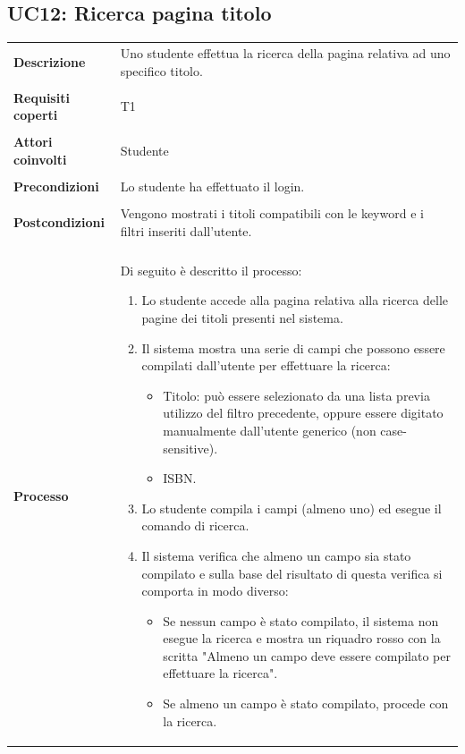 \documentclass[10pt,a4paper]{article}
\begin{document}
	\subsection{UC12: Ricerca pagina titolo}
	\begin{tabular}{lp{}}
		\textbf{Descrizione}&Uno studente effettua la ricerca della pagina relativa ad uno specifico titolo.\\
		\\
		\textbf{Requisiti coperti}&T1\\
		\\
		\textbf{Attori coinvolti}&Studente\\
		\\
		\textbf{Precondizioni}&Lo studente ha effettuato il login.\\
		\\
		\textbf{Postcondizioni}&Vengono mostrati i titoli compatibili con le keyword e i filtri inseriti dall'utente.\\
		\\
		\textbf{Processo}&Di seguito è descritto il processo:
		\begin{enumerate}
			\item Lo studente accede alla pagina relativa alla ricerca delle pagine dei titoli presenti nel sistema.
			\item Il sistema mostra una serie di campi che possono essere compilati dall'utente per effettuare la ricerca:
			\begin{itemize}
				\item Titolo: può essere selezionato da una lista previa utilizzo del filtro precedente, oppure essere digitato manualmente dall'utente generico (non case-sensitive).
				\item ISBN.			
			\end{itemize}
			\item Lo studente compila i campi (almeno uno) ed esegue il comando di ricerca.
			\item Il sistema verifica che almeno un campo sia stato compilato e sulla base del risultato di questa verifica si comporta in modo diverso:
			\begin{itemize}
				\item Se nessun campo è stato compilato, il sistema non esegue la ricerca e mostra un riquadro rosso con la scritta "Almeno un campo deve essere compilato per effettuare la ricerca".
				\item Se almeno un campo è stato compilato, procede con la ricerca.
			\end{itemize}

\end{enumerate}
\end{tabular}
\end{document}
